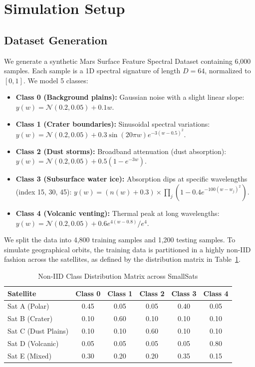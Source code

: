 \documentclass[journal,twocolumn]{IEEEtran}
\begin{document}
\section{Simulation Setup}
\label{sec:sim}

\subsection{Dataset Generation}
We generate a synthetic Mars Surface Feature Spectral Dataset containing 6,000 samples. Each sample is a 1D spectral signature of length $D = 64$, normalized to $[0, 1]$. We model 5 classes:
\begin{itemize}
    \item \textbf{Class 0 (Background plains):} Gaussian noise with a slight linear slope: $y(w) = \mathcal{N}(0.2, 0.05) + 0.1w$.
    \item \textbf{Class 1 (Crater boundaries):} Sinusoidal spectral variations: $y(w) = \mathcal{N}(0.2, 0.05) + 0.3 \sin(20\pi w) e^{-3(w-0.5)^2}$.
    \item \textbf{Class 2 (Dust storms):} Broadband attenuation (dust absorption): $y(w) = \mathcal{N}(0.2, 0.05) + 0.5 (1 - e^{-3w})$.
    \item \textbf{Class 3 (Subsurface water ice):} Absorption dips at specific wavelengths (index 15, 30, 45): $y(w) = (n(w) + 0.3) \times \prod_{j} (1 - 0.4 e^{-100(w-w_j)^2})$.
    \item \textbf{Class 4 (Volcanic venting):} Thermal peak at long wavelengths: $y(w) = \mathcal{N}(0.2, 0.05) + 0.6 e^{4(w-0.8)} / e^4$.
\end{itemize}
We split the data into 4,800 training samples and 1,200 testing samples. To simulate geographical orbits, the training data is partitioned in a highly non-IID fashion across the satellites, as defined by the distribution matrix in Table~\ref{tab:distribution}.

\begin{table}[h]
\centering
\caption{Non-IID Class Distribution Matrix across SmallSats}
\label{tab:distribution}
\begin{tabular}{lccccc}
\toprule
Satellite & Class 0 & Class 1 & Class 2 & Class 3 & Class 4 \\
\midrule
Sat A (Polar)        & 0.45 & 0.05 & 0.05 & 0.40 & 0.05 \\
Sat B (Crater)       & 0.10 & 0.60 & 0.10 & 0.10 & 0.10 \\
Sat C (Dust Plains)  & 0.10 & 0.10 & 0.60 & 0.10 & 0.10 \\
Sat D (Volcanic)     & 0.05 & 0.05 & 0.05 & 0.05 & 0.80 \\
Sat E (Mixed)        & 0.30 & 0.20 & 0.20 & 0.35 & 0.15 \\
\bottomrule
\end{tabular}
\end{table}
\end{document}
